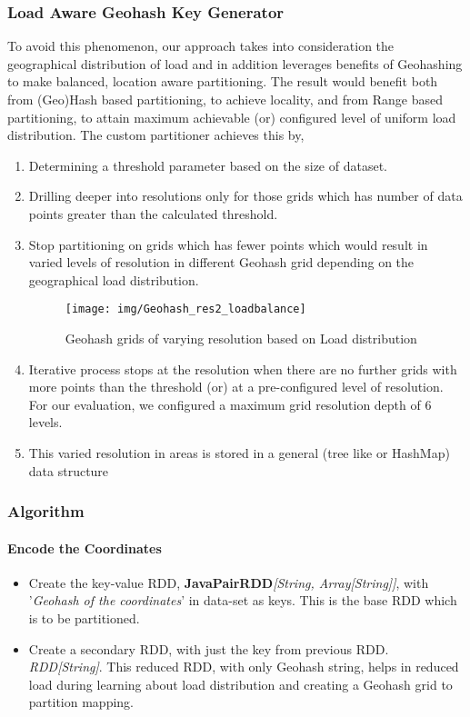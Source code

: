\documentclass[article,type=msc,colorback,10pt,accentcolor=tud1d]{tudthesis}
\begin{document}
			\subsubsection{Load Aware Geohash Key Generator}
				\par To avoid this phenomenon, our approach takes into consideration the geographical distribution of load and in addition leverages benefits of Geohashing to make balanced, location aware partitioning. The result would benefit both from (Geo)Hash based partitioning, to achieve locality, and from Range based partitioning, to attain maximum achievable (or) configured level of uniform load distribution. The custom partitioner achieves this by,
				 \begin{enumerate}
				 	\item Determining a threshold parameter based on the size of dataset.
				 	\item Drilling deeper into resolutions only for those grids which has number of data points greater than the calculated threshold.
				 	\item Stop partitioning on grids which has fewer points which would result in varied levels of resolution in different Geohash grid depending on the geographical load distribution.
				 
				 \begin{figure}[h]
				 	\centering
				 	\texttt{[image: img/Geohash\_res2\_loadbalance]}
				 	\caption{Geohash grids of varying resolution based on Load distribution}
				 	\label{fig:Geohash_res2_loadbalance}
				 \end{figure}		
				 
				 	\item Iterative process stops at the resolution when there are no further grids with more points than the threshold (or) at a pre-configured level of resolution. For our evaluation, we configured a maximum grid resolution depth of 6 levels.
				 	\item This varied resolution in areas is stored in a general (tree like or HashMap) data structure
				 \end{enumerate}
									 
							 
			
			\subsubsection{Algorithm}
			
			\paragraph{Encode the Coordinates}
				\begin{itemize}
					\item Create the key-value RDD, \textbf{JavaPairRDD}\textit{[String, Array[String]]}, with '\textit{Geohash of the coordinates}' in data-set as keys. This is the base RDD which is to be partitioned.
					\item Create a secondary RDD, with just the key from previous RDD. \textit{RDD[String]}. This reduced RDD, with only Geohash string, helps in reduced load during learning about load distribution and creating a Geohash grid to partition mapping. 
				\end{itemize}
\end{document}
